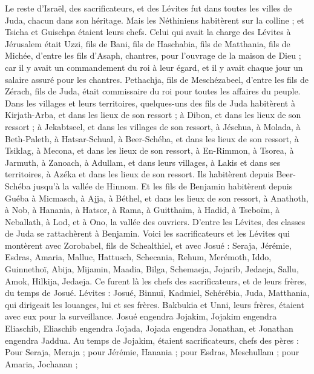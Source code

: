 \begin{multicols}{2}
Le reste d’Israël, des sacrificateurs, et des Lévites fut dans toutes les villes de Juda, chacun dans son héritage.
Mais les Néthiniens habitèrent sur la colline ; et Tsicha et Guischpa étaient leurs chefs.
Celui qui avait la charge des Lévites à Jérusalem était Uzzi, fils de Bani, fils de Haschabia, fils de Matthania, fils de Michée, d'entre les fils d'Asaph, chantres, pour l'ouvrage de la maison de Dieu ;
car il y avait un commandement du roi à leur égard, et il y avait chaque jour un salaire assuré pour les chantres.
Pethachja, fils de Meschézabeel, d'entre les fils de Zérach, fils de Juda, était commissaire du roi pour toutes les affaires du peuple.
Dans les villages et leurs territoires, quelques-uns des fils de Juda habitèrent à Kirjath-Arba, et dans les lieux de son ressort ; à Dibon, et dans les lieux de son ressort ; à Jekabtseel, et dans les villages de son ressort,
à Jéschua, à Molada, à Beth-Paleth,
à Hatsar-Schual, à Beer-Schéba, et dans les lieux de son ressort,
à Tsiklag, à Mecona, et dans les lieux de son ressort,
à En-Rimmon, à Tsorea, à Jarmuth,
à Zanoach, à Adullam, et dans leurs villages, à Lakis et dans ses territoires, à Azéka et dans les lieux de son ressort. Ils habitèrent depuis Beer-Schéba jusqu'à la vallée de Hinnom.
Et les fils de Benjamin habitèrent depuis Guéba à Micmasch, à Ajja, à Béthel, et dans les lieux de son ressort,
à Anathoth, à Nob, à Hanania,
à Hatsor, à Rama, à Guitthaïm,
à Hadid, à Tseboïm, à Neballath,
à Lod, et à Ono, la vallée des ouvriers.
D'entre les Lévites, des classes de Juda se rattachèrent à Benjamin.
\VerseOne{}Voici les sacrificateurs et les Lévites qui montèrent avec Zorobabel, fils de Schealthiel, et avec Josué : Seraja, Jérémie, Esdras,
Amaria, Malluc, Hattusch,
Schecania, Rehum, Merémoth,
Iddo, Guinnethoï, Abija,
Mijamin, Maadia, Bilga,
Schemaeja, Jojarib, Jedaeja,
Sallu, Amok, Hilkija, Jedaeja. Ce furent là les chefs des sacrificateurs, et de leurs frères, du temps de Josué.
Lévites : Josué, Binnuï, Kadmiel, Schérébia, Juda,  Matthania, qui dirigeait les louanges, lui et ses frères.
Bakbukia et Unni, leurs frères, étaient avec eux pour la surveillance.
Josué engendra Jojakim, Jojakim engendra Eliaschib,  Eliaschib engendra Jojada,
Jojada engendra Jonathan, et Jonathan engendra Jaddua.
Au temps de Jojakim, étaient sacrificateurs, chefs des pères : Pour Seraja, Meraja ; pour Jérémie, Hanania ;
pour Esdras, Meschullam ; pour Amaria, Jochanan ;

\end{multicols}
